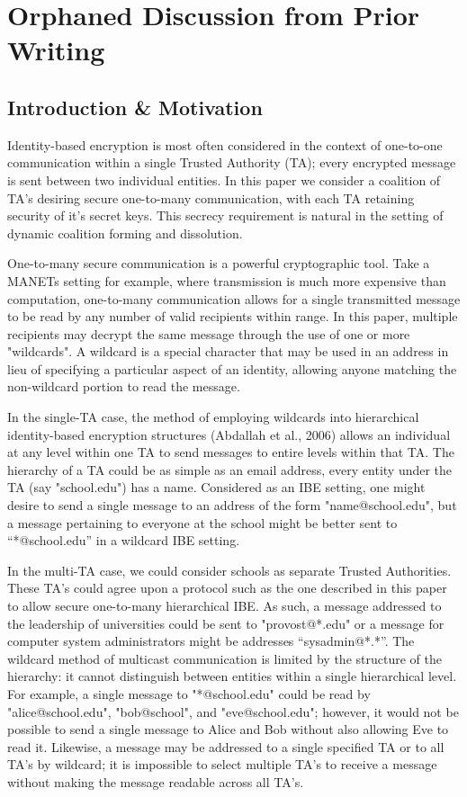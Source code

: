 \documentclass[10pt]{llncs}
\begin{document}
\section{Orphaned Discussion from Prior Writing}

\subsection{Introduction \& Motivation}
Identity-based encryption is most often considered in the context of one-to-one communication within a single Trusted Authority (TA); every encrypted message is sent between two individual entities.  In this paper we consider a coalition of TA's desiring secure one-to-many communication, with each TA retaining security of it's secret keys.  This secrecy requirement is natural in the setting of dynamic coalition forming and dissolution.

One-to-many secure communication is a powerful cryptographic tool.  Take a MANETs setting for example, where transmission is much more expensive than computation, one-to-many communication allows for a single transmitted message to be read by any number of valid recipients within range.  In this paper, multiple recipients may decrypt the same message through the use of one or more "wildcards". A wildcard is a special character that may be used in an address in lieu of specifying a particular aspect of an identity, allowing anyone matching the non-wildcard portion to read the message.

In the single-TA case, the method of employing wildcards into hierarchical identity-based encryption structures (Abdallah et al., 2006) allows an individual at any level within one TA to send messages to entire levels within that TA.  The hierarchy of a TA could be as simple as an email address, every entity under the TA (say "school.edu") has a name. Considered as an IBE setting, one might desire to send a single message to an address of the form "name@school.edu", but a message pertaining to everyone at the school might be better sent to “*@school.edu” in a wildcard IBE setting. 

In the multi-TA case, we could consider schools as separate Trusted Authorities.  These TA's could agree upon a protocol such as the one described in this paper to allow secure one-to-many hierarchical IBE.  As such, a message addressed to the leadership of universities could be sent to "provost@*.edu" or a message for computer system administrators might be addresses “sysadmin@*.*”.  The wildcard method of multicast communication is limited by the structure of the hierarchy: it cannot distinguish between entities within a single hierarchical level.  For example, a single message to "*@school.edu" could be read by "alice@school.edu", "bob@school", and "eve@school.edu"; however, it would not be possible to send a single message to Alice and Bob without also allowing Eve to read it. Likewise, a message may be addressed to a single specified TA or to all TA's by wildcard; it is impossible to select multiple TA's to receive a message without making the message readable across all TA's.
\end{document}
